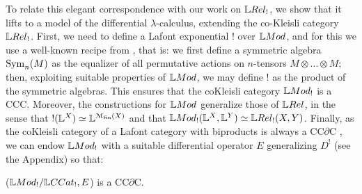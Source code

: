 To relate this elegant correspondence with our work on $\LREL_{!}$, we show that it lifts to a model of the differential $\lambda$-calculus, extending the co-Kleisli category $\LREL_{!}$. 
First, we need to define a Lafont exponential $!$ over $\Mod$, and for this we use a well-known recipe from \cite{Mellies2018, Manzo2013}, that is: we first define a symmetric algebra $\mathrm{Sym}_{n}(M)$ as the equalizer of all permutative actions on $n$-tensors $M\otimes \dots \otimes M$; then, exploiting suitable properties of $\Mod$, we may define $!$ as the product of the symmetric algebras.  
This ensures that the coKleisli category $\Mod_{!}$ is a CCC.
Moreover, the constructions for $\Mod$ generalize those of $\LREL$, in the sense that $!(\mathbb{L}^{X})\simeq \mathbb{L}^{\mathcal{M}_{\mathrm{fin}}(X)}$ and that $\Mod_{!}(\Lawv^{X},\Lawv^{Y})\simeq \LREL_{!}(X,Y)$.
Finally, as the coKleisli category of a Lafont category with biproducts is always a CC$\partial$C \cite{LemayCALCO2021}, we can endow $\Mod_{!}$ with a suitable differential operator $E$ generalizing $D^{!}$ (see the Appendix) so that:
\begin{theorem}
($\Mod_{!}/\GMet_{!},E$) is a CC$\partial$C.
\end{theorem}




